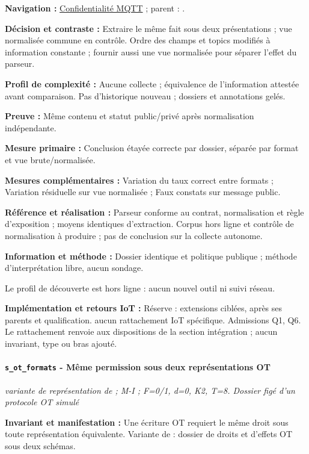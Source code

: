 \documentclass[11pt,a4paper]{article}
\newcommand{\code}[1]{{\small\ttfamily\path{#1}}}
\newcommand{\scenariolink}[1]{\hyperref[scenario:#1]{\code{#1}}}
\newcommand{\comparisonlink}[2]{\hyperlink{comparison:#1}{#2}}
\begin{document}
\textbf{Navigation :} \comparisonlink{E02}{Confidentialité MQTT} ; parent : \scenariolink{s_mqtt_lecture}.

\textbf{Décision et contraste :} Extraire le même fait sous deux présentations ; vue normalisée commune en contrôle. Ordre des champs et topics modifiés à information constante ; fournir aussi une vue normalisée pour séparer l’effet du parseur.

\textbf{Profil de complexité :} Aucune collecte ; équivalence de l’information attestée avant comparaison. Pas d’historique nouveau ; dossiers et annotations gelés.

\textbf{Preuve :} Même contenu et statut public/privé après normalisation indépendante.

\textbf{Mesure primaire :} Conclusion étayée correcte par dossier, séparée par format et vue brute/normalisée.

\textbf{Mesures complémentaires :} Variation du taux correct entre formats ; Variation résiduelle sur vue normalisée ; Faux constats sur message public.

\textbf{Référence et réalisation :} Parseur conforme au contrat, normalisation et règle d’exposition ; moyens identiques d’extraction. Corpus hors ligne et contrôle de normalisation à produire ; pas de conclusion sur la collecte autonome.

\textbf{Information et méthode :} Dossier identique et politique publique ; méthode d’interprétation libre, aucun sondage.

Le profil de découverte est hors ligne : aucun nouvel outil ni suivi réseau.

\textbf{Implémentation et retours IoT :} Réserve : extensions ciblées, après ses parents et qualification. aucun rattachement IoT spécifique. Admissions Q1, Q6. Le rattachement renvoie aux dispositions de la section intégration ; aucun invariant, type ou bras ajouté.

\par\noindent\begin{minipage}{\linewidth}\setlength{\parskip}{5pt}\paragraph{\texttt{s\_ot\_formats} - Même permission sous deux représentations OT}\label{scenario:s_ot_formats}
\textit{variante de représentation de \scenariolink{s_ot_ecriture} ; M-I ; F=0/1, d=0, K2, T=8. Dossier figé d’un protocole OT simulé}

\textbf{Invariant et manifestation :} Une écriture OT requiert le même droit sous toute représentation équivalente. Variante de \scenariolink{s_ot_ecriture} : dossier de droits et d’effets OT sous deux schémas.\par\end{minipage}\par
\end{document}
